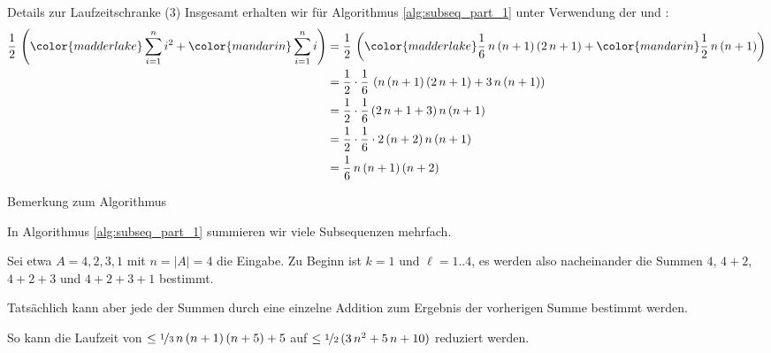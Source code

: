 \begin{frame}{Details zur Laufzeitschranke (3)}
    Insgesamt erhalten wir f\"ur Algorithmus \ref{alg:subseq_part_1} unter Verwendung der  und :
    \begin{align*}
        \frac{1}{2} \, \left({\color{madderlake}\sum_{i=1}^n i^2} + {\color{mandarin}\sum_{i=1}^n i} \right) &= \frac{1}{2} \, \left({\color{madderlake}\frac{1}{6} \, n \, (n + 1) \, (2 \, n + 1)} + {\color{mandarin}\frac{1}{2} \, n \, (n+1)} \right) \\
        &= \frac{1}{2} \cdot \frac{1}{6} \, \left( n \, (n+1) \, (2\,n+1) + 3 \, n \, (n+1) \right) \\
        &= \frac{1}{2} \cdot \frac{1}{6} \, (2\,n+1+3) \, n \, (n+1) \\
        &= \frac{1}{2} \cdot \frac{1}{6} \cdot 2\, (n+2) \, n \, (n+1) \\
        &= \frac{1}{6} \, n \, (n+1) \, (n+2)
    \end{align*}
\end{frame}

\begin{frame}{Bemerkung zum Algorithmus}
    \begin{remark}
        In Algorithmus \ref{alg:subseq_part_1} summieren wir viele Subsequenzen mehrfach.
        
        Sei etwa $A = 4, 2, 3, 1$ mit $n=|A|=4$ die Eingabe.
        Zu Beginn ist $k=1$ und $\ell=1..4$, es werden also nacheinander die Summen $4$, $4+2$, $4+2+3$ und $4+2+3+1$ bestimmt.
        
        Tats\"achlich kann aber jede der Summen durch \alert{eine einzelne Addition} zum Ergebnis der vorherigen Summe bestimmt werden.
        
        So kann die Laufzeit von $\leq \nicefrac{1}{3} \, n \, (n+1) \, (n+5) + 5$ auf $\leq \nicefrac{1}{2} \, (3 \, n^2 + 5 \, n + 10)$ reduziert werden.
    \end{remark}
\end{frame}


